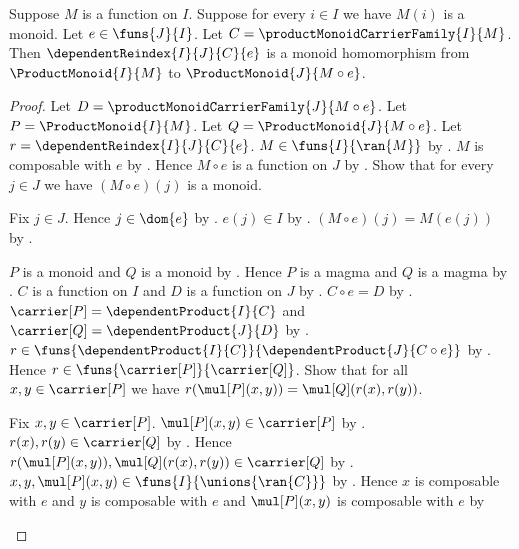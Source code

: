 \begin{theorem}\label{product_monoid_reindex_hom}
    Suppose $M$ is a function on $I$.
    Suppose for every $i\in I$ we have $M(i)$ is a monoid.
    Let $e\in\funs{J}{I}$.
    Let $C=\productMonoidCarrierFamily{I}{M}$.
    Then $\dependentReindex{I}{J}{C}{e}$ is a monoid homomorphism from
        $\ProductMonoid{I}{M}$ to $\ProductMonoid{J}{M\circ e}$.
\end{theorem}
\begin{proof}
    Let $D=\productMonoidCarrierFamily{J}{M\circ e}$.
    Let $P=\ProductMonoid{I}{M}$.
    Let $Q=\ProductMonoid{J}{M\circ e}$.
    Let $r=\dependentReindex{I}{J}{C}{e}$.
    $M\in\funs{I}{\ran{M}}$ by
        .
    $M$ is composable with $e$ by .
    Hence $M\circ e$ is a function on $J$ by
        .
    Show that for every $j\in J$ we have $(M\circ e)(j)$ is a monoid.
    \begin{subproof}
        Fix $j\in J$.
        Hence $j\in\dom{e}$ by .
        $e(j)\in I$ by .
        $(M\circ e)(j)=M(e(j))$ by
            .
    \end{subproof}
    $P$ is a monoid and $Q$ is a monoid by
        .
    Hence $P$ is a magma and $Q$ is a magma by
        .
    $C$ is a function on $I$ and $D$ is a function on $J$ by
        .
    $C\circ e=D$ by .
    $\carrier[P]=\dependentProduct{I}{C}$ and
        $\carrier[Q]=\dependentProduct{J}{D}$ by
        .
    $r\in\funs{\dependentProduct{I}{C}}{
        \dependentProduct{J}{C\circ e}}$ by
        .
    Hence $r\in\funs{\carrier[P]}{\carrier[Q]}$.
    Show that for all $x,y\in\carrier[P]$ we have
        $r(\mul[P](x,y))=\mul[Q](r(x),r(y))$.
    \begin{subproof}
        Fix $x,y\in\carrier[P]$.
        $\mul[P](x,y)\in\carrier[P]$ by .
        $r(x),r(y)\in\carrier[Q]$ by .
        Hence $r(\mul[P](x,y)),\mul[Q](r(x),r(y))
            \in\carrier[Q]$ by
            .
        $x,y,\mul[P](x,y)\in\funs{I}{\unions{\ran{C}}}$ by
            .
        Hence $x$ is composable with $e$ and $y$ is composable with $e$
            and $\mul[P](x,y)$ is composable with $e$ by

\end{subproof}
\end{proof}
